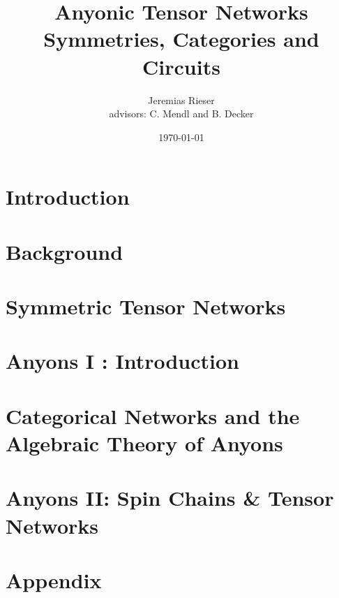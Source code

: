 \documentclass[11pt,a4paper]{report}
\title{Anyonic Tensor Networks \\ \large Symmetries, Categories and Circuits}
\author{Jeremias Rieser \\ \small{advisors: C. Mendl and B. Decker}}
\begin{document}
\date{\today}

\maketitle

\tableofcontents


\setcounter{secnumdepth}{-1}
\chapter{Introduction}
\label{sect:Introduction}

\newpage

\setcounter{secnumdepth}{2}
\chapter{Background}
\label{sect:background}

\newpage

\chapter{Symmetric Tensor Networks}
\label{sect:symmetricTensorNetworks}

\newpage

\chapter{Anyons I : Introduction}
\label{sec:anyonsIntro}


\chapter{Categorical Networks and the Algebraic Theory of Anyons}
\label{sect:Categories}

\newpage

\chapter{Anyons II: Spin Chains \& Tensor Networks}
\label{sect:Anyons}

\newpage

% 

\appendix
\chapter{Appendix}


\end{document}
